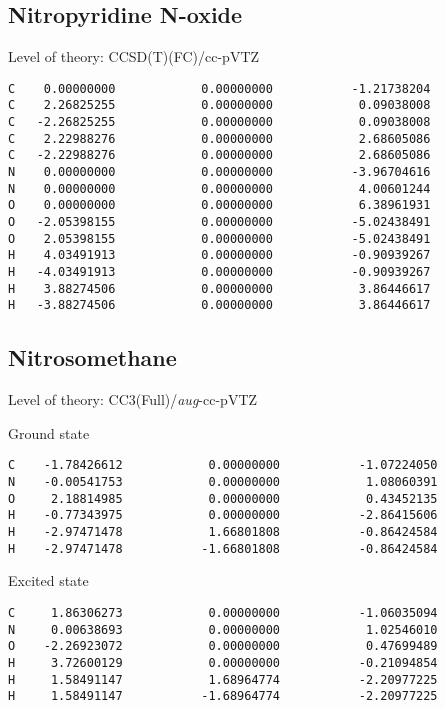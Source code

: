 \documentclass[journal=jctcce,manuscript=article,layout=traditional]{achemso}
\newcommand{\TZ}{cc-pVTZ}
\newcommand{\AVTZ}{\emph{aug}-cc-pVTZ}
\begin{document}
\subsection*{Nitropyridine N-oxide}

\begin{singlespace}
Level of theory: CCSD(T)(FC)/{\TZ}
\begin{verbatim}
C    0.00000000            0.00000000           -1.21738204
C    2.26825255            0.00000000            0.09038008
C   -2.26825255            0.00000000            0.09038008
C    2.22988276            0.00000000            2.68605086
C   -2.22988276            0.00000000            2.68605086
N    0.00000000            0.00000000           -3.96704616
N    0.00000000            0.00000000            4.00601244
O    0.00000000            0.00000000            6.38961931
O   -2.05398155            0.00000000           -5.02438491
O    2.05398155            0.00000000           -5.02438491
H    4.03491913            0.00000000           -0.90939267
H   -4.03491913            0.00000000           -0.90939267
H    3.88274506            0.00000000            3.86446617
H   -3.88274506            0.00000000            3.86446617
\end{verbatim}
\end{singlespace}

\subsection*{Nitrosomethane}

\begin{singlespace}
Level of theory: CC3(Full)/{\AVTZ}
\end{singlespace}

\begin{singlespace}
\noindent Ground state
\begin{verbatim}
C    -1.78426612            0.00000000           -1.07224050
N    -0.00541753            0.00000000            1.08060391
O     2.18814985            0.00000000            0.43452135
H    -0.77343975            0.00000000           -2.86415606
H    -2.97471478            1.66801808           -0.86424584
H    -2.97471478           -1.66801808           -0.86424584
\end{verbatim}
\end{singlespace}

\begin{singlespace}
\noindent Excited state
\begin{verbatim}
C     1.86306273            0.00000000           -1.06035094
N     0.00638693            0.00000000            1.02546010
O    -2.26923072            0.00000000            0.47699489
H     3.72600129            0.00000000           -0.21094854
H     1.58491147            1.68964774           -2.20977225
H     1.58491147           -1.68964774           -2.20977225
\end{verbatim}
\end{singlespace}
\end{document}
